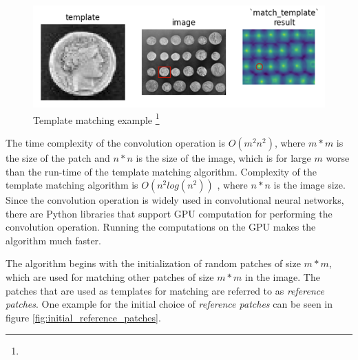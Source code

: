 \documentclass[fleqn,10pt]{wlscirep}
\begin{document}



\begin{figure}
	\centering
	\includegraphics[scale=0.8]{./imgs/template_matching.png}
	\caption[Template matching example]{Template matching example \footnote{\footnotemark} }
	\label{fig:template_matching}
\end{figure} 


The time complexity of the convolution operation is $O(m^2n^2)$, where $m*m$ is the size of the patch and $n*n$ is the size of the image, which is for large $m$ worse than the run-time of the template matching algorithm. Complexity of the template matching algorithm is $O(n^2log(n^2))$ \cite{template_matching}, where $n*n$ is the image size. Since the convolution operation is widely used in convolutional neural networks, there are Python libraries that support GPU computation for performing the convolution operation. Running the computations on the GPU makes the algorithm much faster.

The algorithm begins with the initialization of random patches of size $m*m$, which are used for matching other patches of size $m*m$ in the image. The patches that are used as templates for matching are referred to as \textit{reference patches}. One example for the initial choice of \textit{reference patches} can be seen in figure \ref{fig:initial_reference_patches}. 
\end{document}
